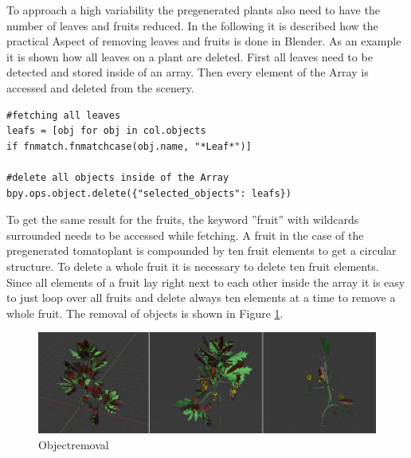 To approach a high variability the pregenerated plants also need to have the number of leaves and fruits reduced.
In the following it is described how the practical Aspect of removing leaves and fruits is done in Blender.
As an example it is shown how all leaves on a plant are deleted. \newline
First all leaves need to be detected and stored inside of an array. Then every element of the Array is accessed and deleted from the scenery.
\lstset{language=Python, frame=single}
\begin{lstlisting}
#fetching all leaves
leafs = [obj for obj in col.objects
if fnmatch.fnmatchcase(obj.name, "*Leaf*")]

#delete all objects inside of the Array
bpy.ops.object.delete({"selected_objects": leafs})
\end{lstlisting}
To get the same result for the fruits, the keyword ''fruit'' with wildcards surrounded needs to be accessed while fetching. A fruit in the case of the pregenerated tomatoplant is compounded by ten fruit elements to get a circular structure. To delete a whole fruit it is necessary to delete ten fruit elements. Since all elements of a fruit lay right next to each other inside the array it is easy to just loop over all fruits and delete always ten elements at a time to remove a whole fruit.
\newline
The removal of objects is shown in Figure \ref{order}.

\begin{figure}[h]
\centering
\includegraphics[width=1\textwidth]{examples.png}
\caption{Objectremoval}
\label{order}
\end{figure}


